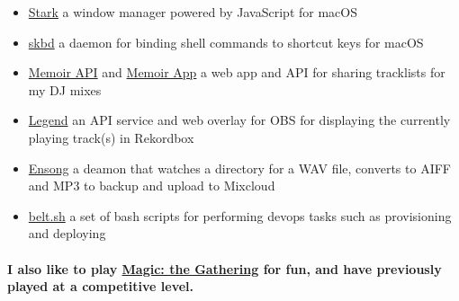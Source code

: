 \documentclass[a4paper]{article}
\begin{document}
\begin{itemize}
  \item \href{https://github.com/starkwm/stark}{Stark} a window manager powered by JavaScript for macOS
  \item \href{https://github.com/starkwm/skbd}{skbd} a daemon for binding shell commands to shortcut keys for macOS
  \item \href{https://github.com/tombell/memoir}{Memoir API} and \href{https://github.com/tombell/memoir-app}{Memoir App}  a web app and API for sharing tracklists for my DJ mixes
  \item \href{https://github.com/tombell/legend}{Legend} an API service and web overlay for OBS for displaying the currently playing track(s) in Rekordbox
  \item \href{https://github.com/tombell/ensong}{Ensong} a deamon that watches a directory for a WAV file, converts to AIFF and MP3 to backup and upload to Mixcloud
  \item \href{https://github.com/belt-project/belt.sh}{belt.sh} a set of bash scripts for performing devops tasks such as provisioning and deploying
\end{itemize}

\paragraph{I also like to play \href{https://magic.wizards.com/en}{Magic: the Gathering} for fun, and have previously played at a competitive level.}
\end{document}
